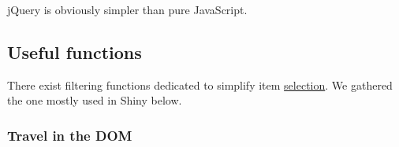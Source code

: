 \documentclass[]{book}
\begin{document}
jQuery is obviously simpler than pure JavaScript.

\hypertarget{useful-functions}{%
\subsection{Useful functions}\label{useful-functions}}

There exist filtering functions dedicated to simplify item \href{https://api.jquery.com/category/traversing/}{selection}. We gathered the one mostly used in Shiny below.

\hypertarget{travel-in-the-dom}{%
\subsubsection{Travel in the DOM}\label{travel-in-the-dom}}
\end{document}
